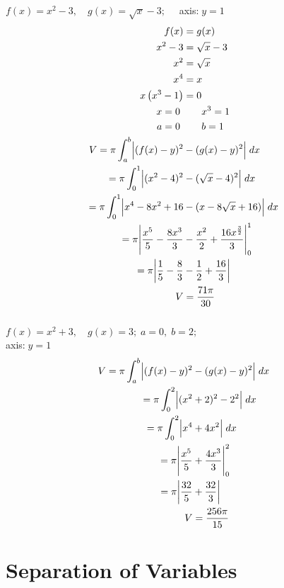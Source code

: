 \documentclass[12pt]{article}
\begin{document}
\begin{multicols}{2}
\begin{center}
\columnbreak
    $f(x)=x^2-3,\quad g(x)=\sqrt{x}-3;\quad$ axis:$\;y=1$
    \begin{align*}
        f(x) &= g(x) \\
        x^2-3&=\sqrt{x}-3 \\
        x^2&=\sqrt{x}\\
        x^4&=x\\
        x\left(x^3-1\right)&=0\\
        x=0\ &\qquad\! x^3=1 \\
        a=0\ &\qquad\! b=1 \\
        V=\pi\int^b_a\Bigl|(f(x)-y)^2 &-(g(x)-y)^2\Bigr|\;dx \\
        =\pi\int^1_0\Bigl|(x^2-4)^2 &-(\sqrt{x}-4)^2\Bigr|\;dx \\
        =\pi\int^1_0\Bigl|x^4-8x^2+16 &-(x-8\sqrt{x}+16)\Bigr|\;dx \\
        =\pi\Biggl|\frac{x^5}{5}-\frac{8x^3}{3} &- \frac{x^2}{2}+\frac{16x^{\frac{3}{2}}}{3}\Biggr|^1_0 \\
        =\pi\biggl|\frac{1}{5}-\frac{8}{3}&-\frac{1}{2}+\frac{16}{3}\biggr| \\
        V&=\frac{71\pi}{30} \\
    \end{align*} 
    \vspace{3pt}\\
    $f(x)=x^2+3,\quad g(x)=3;\;a=0,\;b=2;$\\
    \raggedleft axis:$\;y=1\quad$ 
    \begin{align*}
        V=\pi\int^b_a\Bigl|(f(x)-y)^2 &-(g(x)-y)^2\Bigr|\;dx \\
        =\pi\int^2_0\Bigl|(x^2&+2)^2 -2^2\Bigr|\;dx \\
        =\pi\int^2_0\Bigl|x^4&+4x^2\Bigr|\;dx \\
        =\pi\Biggl|\frac{x^5}{5}&+\frac{4x^3}{3} \Biggr|^2_0 \\
        =\pi\biggl|\frac{32}{5}&+\frac{32}{3}\biggr| \\
        V&=\frac{256\pi}{15} \\ 
    \end{align*} 
\end{center}
\end{multicols}
\newpage
\section{Separation of Variables}
\end{document}
